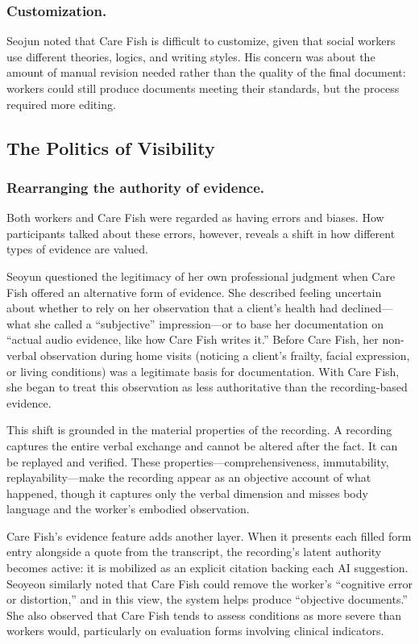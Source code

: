 \documentclass{article}
\begin{document}
\subsubsection{Customization.}

Seojun noted that Care Fish is difficult to customize, given that social workers use different theories, logics, and writing styles. His concern was about the amount of manual revision needed rather than the quality of the final document: workers could still produce documents meeting their standards, but the process required more editing.

\subsection{The Politics of Visibility}

\subsubsection{Rearranging the authority of evidence.}

Both workers and Care Fish were regarded as having errors and biases. How participants talked about these errors, however, reveals a shift in how different types of evidence are valued.

Seoyun questioned the legitimacy of her own professional judgment when Care Fish offered an alternative form of evidence. She described feeling uncertain about whether to rely on her observation that a client's health had declined---what she called a ``subjective'' impression---or to base her documentation on ``actual audio evidence, like how Care Fish writes it.'' Before Care Fish, her non-verbal observation during home visits (noticing a client's frailty, facial expression, or living conditions) was a legitimate basis for documentation. With Care Fish, she began to treat this observation as less authoritative than the recording-based evidence.

This shift is grounded in the material properties of the recording. A recording captures the entire verbal exchange and cannot be altered after the fact. It can be replayed and verified. These properties---comprehensiveness, immutability, replayability---make the recording appear as an objective account of what happened, though it captures only the verbal dimension and misses body language and the worker's embodied observation.

Care Fish's evidence feature adds another layer. When it presents each filled form entry alongside a quote from the transcript, the recording's latent authority becomes active: it is mobilized as an explicit citation backing each AI suggestion. Seoyeon similarly noted that Care Fish could remove the worker's ``cognitive error or distortion,'' and in this view, the system helps produce ``objective documents.'' She also observed that Care Fish tends to assess conditions as more severe than workers would, particularly on evaluation forms involving clinical indicators.
\end{document}
